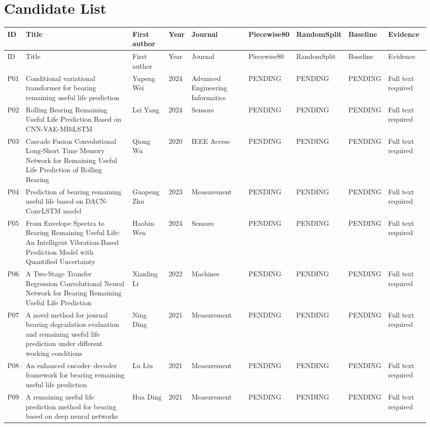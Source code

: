 \documentclass[10pt]{article}
\begin{document}
\section*{Candidate List}
\small
\setlength{\tabcolsep}{3pt}
\begin{longtable}{p{0.7cm} p{3.2cm} p{2.6cm} p{1.0cm} p{1.8cm} p{1.5cm} p{1.5cm} p{1.5cm} p{1.9cm}}
\toprule
ID & Title & First author & Year & Journal & Piecewise80 & RandomSplit & Baseline & Evidence \\
\midrule
\endfirsthead
\toprule
ID & Title & First author & Year & Journal & Piecewise80 & RandomSplit & Baseline & Evidence \\
\midrule
\endhead
P01 & Conditional variational transformer for bearing remaining useful life prediction & Yupeng Wei & 2024 & Advanced Engineering Informatics & PENDING & PENDING & PENDING & Full text required \\
P02 & Rolling Bearing Remaining Useful Life Prediction Based on CNN-VAE-MBiLSTM & Lei Yang & 2024 & Sensors & PENDING & PENDING & PENDING & Full text required \\
P03 & Cascade Fusion Convolutional Long-Short Time Memory Network for Remaining Useful Life Prediction of Rolling Bearing & Qiong Wu & 2020 & IEEE Access & PENDING & PENDING & PENDING & Full text required \\
P04 & Prediction of bearing remaining useful life based on DACN-ConvLSTM model & Guopeng Zhu & 2023 & Measurement & PENDING & PENDING & PENDING & Full text required \\
P05 & From Envelope Spectra to Bearing Remaining Useful Life: An Intelligent Vibration-Based Prediction Model with Quantified Uncertainty & Haobin Wen & 2024 & Sensors & PENDING & PENDING & PENDING & Full text required \\
P06 & A Two-Stage Transfer Regression Convolutional Neural Network for Bearing Remaining Useful Life Prediction & Xianling Li & 2022 & Machines & PENDING & PENDING & PENDING & Full text required \\
P07 & A novel method for journal bearing degradation evaluation and remaining useful life prediction under different working conditions & Ning Ding & 2021 & Measurement & PENDING & PENDING & PENDING & Full text required \\
P08 & An enhanced encoder–decoder framework for bearing remaining useful life prediction & Lu Liu & 2021 & Measurement & PENDING & PENDING & PENDING & Full text required \\
P09 & A remaining useful life prediction method for bearing based on deep neural networks & Hua Ding & 2021 & Measurement & PENDING & PENDING & PENDING & Full text required \\

\end{longtable}
\end{document}
